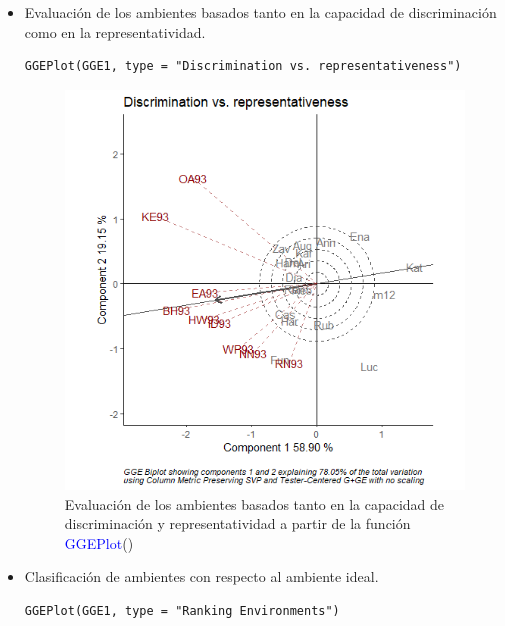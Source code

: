 \begin{itemize}
\item Evaluación de los ambientes basados tanto en la capacidad de discriminación como en la representatividad.

\begin{lstlisting}
GGEPlot(GGE1, type = "Discrimination vs. representativeness")
\end{lstlisting}

\begin{figure}[H]
	\begin{center}
		\includegraphics[width=12cm]{./Graficos/Discriminationvsrepresentativeness.png}
	\end{center}
	\caption{Evaluación de los ambientes basados tanto en la capacidad de discriminación y representatividad a partir de la función \textcolor{blue}{GGEPlot}()}
\end{figure}



\item Clasificación de ambientes con respecto al ambiente ideal.

\begin{lstlisting}
GGEPlot(GGE1, type = "Ranking Environments")
\end{lstlisting}


\end{itemize}
